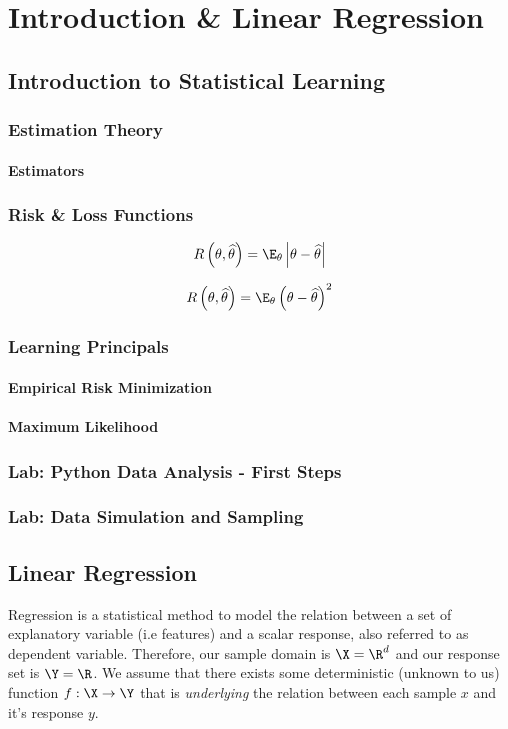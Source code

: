 \chapter{Introduction \& Linear Regression}
\section{Introduction to Statistical Learning}
\subsection{Estimation Theory}
\subsubsection{Estimators}
\subsection{Risk \& Loss Functions}
\begin{equation}
R\left(\theta,\widehat{\theta}\right)=\E_\theta\left|\theta-\widehat{\theta}\right|
\label{eqn:abs}
\end{equation}

\begin{equation}
R\left(\theta,\widehat{\theta}\right)=\E_\theta\left(\theta-\widehat{\theta}\right)^2
\label{eqn:mse}
\end{equation}
\subsection{Learning Principals}
\subsubsection{Empirical Risk Minimization}
\subsubsection{Maximum Likelihood}
\subsection{Lab: Python Data Analysis - First Steps}
\subsection{Lab: Data Simulation and Sampling}
\newpage
\section{Linear Regression}
Regression is a statistical method to model the relation between a set of explanatory variable (i.e features) and a scalar response, also referred to as dependent variable. Therefore, our sample domain is $\X=\R^d$ and our response set is $\Y=\R$. We assume that there exists some deterministic (unknown to us) function $f:\X\rightarrow\Y$ that is \textit{underlying} the relation between each sample $x$ and it's response $y$.


